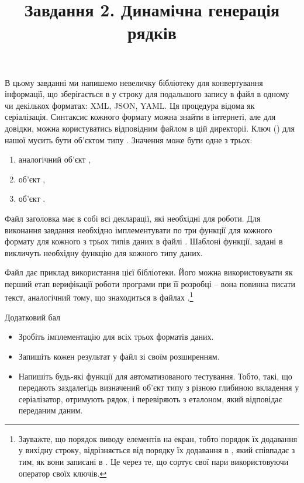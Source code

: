 \documentclass[12pt]{article}
\title{Завдання 2. Динамічна генерація рядків}
\begin{document}
\maketitle

В цьому завданні ми напишемо невеличку бібліотеку для конвертування інформації, що зберігається в  у строку для подальшого запису в файл в одному чи декількох форматах: XML, JSON, YAML. Ця процедура відома як серіалізація. Синтаксис кожного формату можна знайти в інтернеті, але для довідки, можна користуватись відповідним  файлом в цій директорії.
Ключ () для нашої  мусить бути об'єктом типу . Значення може бути одне з трьох:
\begin{enumerate}
  \item аналогічний об'єкт ,
  \item об'єкт ,
  \item об'єкт .
\end{enumerate}

Файл заголовка  має в собі всі декларації, які необхідні для роботи. Для виконання завдання необхідно імплементувати по три функції для кожного формату для кожного з трьох типів даних в файлі . Шаблоні функції, задані в  викличуть необхідну функцію для кожного типу даних.

Файл  дає приклад використання цієї бібліотеки. Його можна використовувати як перший етап верифікації роботи програми при її розробці -- вона повинна писати текст, аналогічний тому, що знаходиться в файлах .\footnote{Зауважте, що порядок виводу елементів на екран, тобто порядок їх додавання у вихідну строку, відрізняється від порядку їх додавання в , який співпадає з тим, як вони записані в . Це через те, що  сортує свої пари використовуючи оператор \m{<} своїх ключів.}

\begin{center}
    \large{Додатковий бал}
\end{center}

\begin{itemize}
\item Зробіть імплементацію для всіх трьох форматів даних.
\item Запишіть кожен результат у файл зі своїм розширенням.
\item Напишіть будь-які функції для автоматизованого тестування. Тобто, такі, що передають заздалегідь визначений об'єкт типу  з різною глибиною вкладення у серіалізатор, отримують рядок, і перевіряють з еталоном, який відповідає переданим даним.
\end{itemize}
\end{document}
